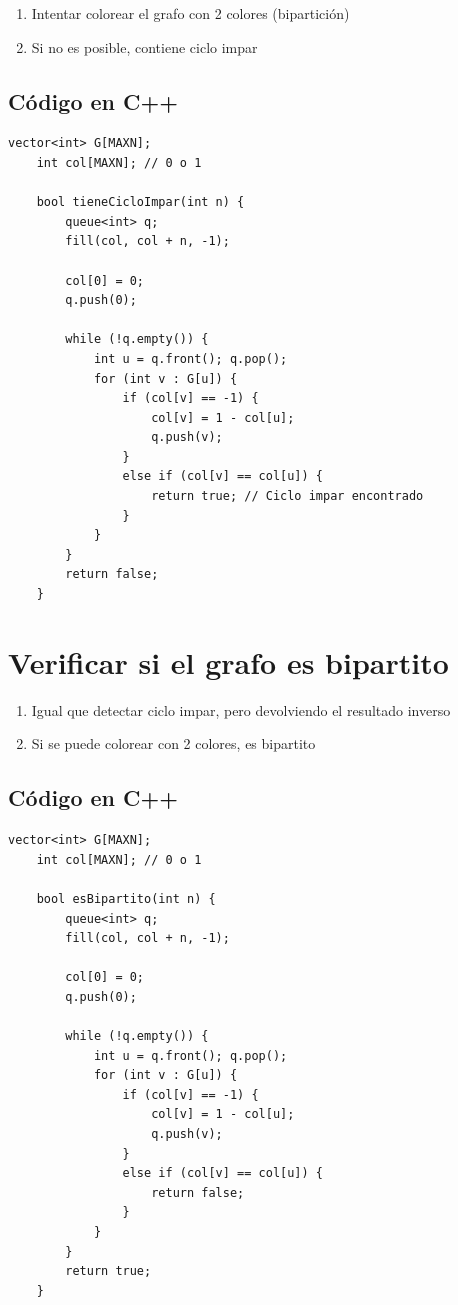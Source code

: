 \begin{enumerate}
	\item Intentar colorear el grafo con 2 colores (bipartición)
	\item Si no es posible, contiene ciclo impar
\end{enumerate}

\subsection*{Código en C++}

\begin{lstlisting}[caption=Detectar ciclo impar]
	vector<int> G[MAXN];
	int col[MAXN]; // 0 o 1
	
	bool tieneCicloImpar(int n) {
		queue<int> q;
		fill(col, col + n, -1);
		
		col[0] = 0;
		q.push(0);
		
		while (!q.empty()) {
			int u = q.front(); q.pop();
			for (int v : G[u]) {
				if (col[v] == -1) {
					col[v] = 1 - col[u];
					q.push(v);
				}
				else if (col[v] == col[u]) {
					return true; // Ciclo impar encontrado
				}
			}
		}
		return false;
	}
\end{lstlisting}

\section{Verificar si el grafo es bipartito}

\begin{enumerate}
	\item Igual que detectar ciclo impar, pero devolviendo el resultado inverso
	\item Si se puede colorear con 2 colores, es bipartito
\end{enumerate}

\subsection*{Código en C++}

\begin{lstlisting}[caption=Verificar si grafo es bipartito]
	vector<int> G[MAXN];
	int col[MAXN]; // 0 o 1
	
	bool esBipartito(int n) {
		queue<int> q;
		fill(col, col + n, -1);
		
		col[0] = 0;
		q.push(0);
		
		while (!q.empty()) {
			int u = q.front(); q.pop();
			for (int v : G[u]) {
				if (col[v] == -1) {
					col[v] = 1 - col[u];
					q.push(v);
				}
				else if (col[v] == col[u]) {
					return false;
				}
			}
		}
		return true;
	}
\end{lstlisting}

